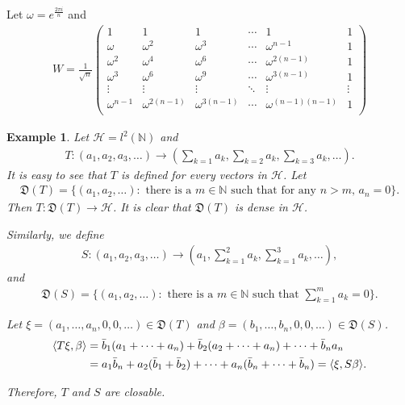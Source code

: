 \documentclass[a4paper,10pt]{amsart}
\newtheorem{example}{Example}[section]
\newcommand{\HHH}{\mathcal H} %
\newcommand{\DDD}{\mathfrak D}
\newcommand{\N}{\mathbb N} %
\begin{document}
Let $\omega = e^{\frac{2 \pi i}{n}}$ and  
\begin{align*}
    W = \frac{1}{\sqrt{n}}\begin{pmatrix}
       1 & 1 & 1 & \cdots & 1 & 1 \\
       \omega & \omega^{2} & \omega^{3} & \cdots & \omega^{n-1} & 1 \\ 
       \omega^{2} & \omega^{4} & \omega^{6}&\cdots & \omega^{2(n-1)} & 1 \\ 
       \omega^{3} & \omega^{6} & \omega^{9}&\cdots & \omega^{3(n-1)} & 1 \\ 
       \vdots & \vdots & \vdots & \ddots & \vdots & \vdots  \\
       \omega^{n-1} & \omega^{2(n-1)} & \omega^{3(n-1)} & 
       \cdots & \omega^{(n-1)(n-1)} & 1 \\ 
   \end{pmatrix} 
\end{align*}


\begin{example}
 Let $\HHH = l^{2}(\N)$ and 
\begin{align*}
    T : (a_1, a_2, a_3, \ldots ) \to (\sum_{k=1}a_k,\sum_{k=2}a_k,
    \sum_{k=3}a_k, \ldots).
\end{align*}
It is easy to see that $T$ is defined for every vectors in $\HHH$.
Let
\begin{align*}
    \DDD(T) = \{(a_1, a_2, \ldots) : \mbox{ there is a $m \in \N$ such
    that for any $n > m$, $a_n = 0$} \}. 
\end{align*}
Then $T: \DDD(T) \to \HHH$. It is clear that $\DDD(T)$ is dense in $\HHH$.

Similarly, we define
\begin{align*}
    S : (a_1, a_2, a_3, \ldots ) \to (a_1,\sum_{k=1}^{2}a_k,
    \sum_{k=1}^{3}a_k, \ldots),
\end{align*}
and 
\begin{align*}
    \DDD(S) = \{(a_1, a_2, \ldots) : \mbox{ there is a $m \in \N$ such
    that $\sum^{m}_{k=1}a_k = 0$} \}.
\end{align*}

Let $\xi = (a_1, \ldots, a_n, 0, 0, \ldots) \in \DDD(T)$ and 
$\beta = (b_1, \ldots, b_n, 0, 0, \ldots) \in \DDD(S)$.
\begin{align*}
    \langle T\xi, \beta \rangle &= \Bar{b}_{1}(a_1 + \cdots + a_n)
    + \Bar{b}_{2}(a_2 + \cdots + a_n) + \cdots + \Bar{b}_{n}a_n \\
    & = a_{1}\Bar{b}_{n} + a_{2}(\Bar{b}_{1} + \Bar{b}_{2}) + \cdots + 
    a_{n}(\Bar{b}_{n} + \cdots + \Bar{b}_{n}) = \langle \xi, S\beta \rangle.
\end{align*}

Therefore, $T$ and $S$ are closable.
   
\end{example}
\end{document}
